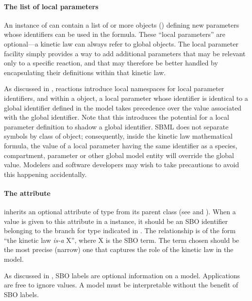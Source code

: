 \paragraph{The list of local parameters}

An instance of \KineticLaw can contain a list of  or more
\LocalParameter objects ()
defining new parameters whose identifiers can be used in the
 formula.  These ``local parameters'' are optional---a
kinetic law can always refer to global \Parameter objects.  The
local parameter facility simply provides a way to add additional
parameters that may be relevant only to a specific reaction, and
that may therefore be better handled by encapsulating their
definitions within that kinetic law.

As discussed in , reactions introduce
local namespaces for local parameter identifiers, and within a
\KineticLaw object\vertwo{\xspace(as well as within the parent \Reaction)}, a local parameter whose identifier is
identical to a global identifier defined in the model takes
precedence over the value associated with the global identifier.
Note that this introduces the potential for a local parameter
definition to shadow a global identifier.  SBML does not separate
symbols by class of object; consequently, inside the kinetic law
mathematical formula, the value of a local parameter having the
same identifier as a species, compartment, parameter or other
global model entity will override the global value.  Modelers and
software developers may wish to take precautions to avoid this
happening accidentally.


\paragraph{The  attribute}

\KineticLaw  inherits an optional 
attribute of type  from its parent
class \SBase (see 
and ).  When a value is given to this
attribute in a  \KineticLaw instance, it should be an
SBO identifier belonging to the branch for type  \KineticLaw
indicated in .  The relationship is
of the form ``the kinetic law \emph{is-a} X'', where X is
the SBO term.  The term chosen should be the most precise (narrow)
one that captures the role of the kinetic law in the model.

As discussed in , SBO labels are optional
information on a model.  Applications are free to ignore
 values.  A model must be interpretable without the
benefit of SBO labels.


